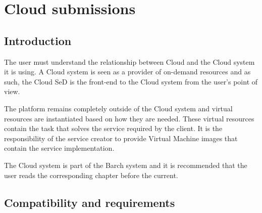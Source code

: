 
\chapter{Cloud submissions}\label{chapter:cloudSubmission}
\section{Introduction}

The user must understand the relationship between \diet Cloud and the Cloud system it is using.
A Cloud system is seen as a provider of on-demand resources and as such, the \diet Cloud SeD
is the front-end to the Cloud system from the \diet user's point of view.

The \diet platform remains completely outside of the Cloud system and virtual resources are
instantiated based on how they are needed. These virtual resources contain the task that solves
the service required by the \diet client. It is the responsibility of the \diet service
creator to provide Virtual Machine images that contain the service implementation. 

The \diet Cloud system is part of the \diet Barch system and it is recommended that the user
reads the corresponding chapter before the current.

\section{Compatibility and requirements}

